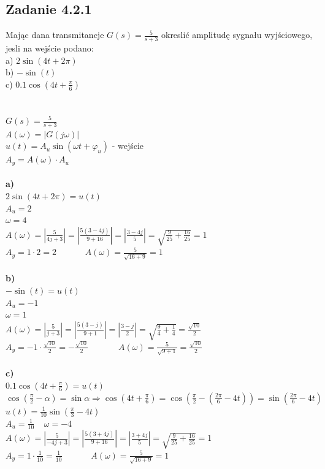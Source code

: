 \subsection*{Zadanie 4.2.1} {\color{darkgray}
	Mając dana transmitancje $G(s)=\frac{5}{s+3}$ okreslić amplitudę sygnału wyjściowego, jesli na wejście podano:\\
	a) $2\sin(4t+2 \pi)$\\
	b) $-\sin(t)$\\
	c) $0.1\cos(4t+\frac\pi 6)$\\
}\lineh
\\\\
$G(s)=\frac{5}{s+3}$\\
$A(\omega)=|G(j\omega)|$\\
$u(t)=A_u\sin(\omega t+\varphi_u )$ - wejście\\
$A_y=A(\omega) \cdot A_u$\\
\\
\textbf{a)}\\
$2\sin(4t+2\pi)=u(t)$\\
$A_u=2$\\
$\omega=4$\\
$A(\omega)=|\frac{5}{4j+3}|=|\frac{5(3-4j)}{9+16}|=|\frac{3-4j}{5}|=\sqrt{\frac{9}{25}+\frac{16}{25}}=1$\\
$A_y=1 \cdot 2 = \boxed{2}$ \ \ \ \ \ \   {\color{lightgray}$A(\omega)=\frac{5}{\sqrt{16+9}}=1$}\\
\\
\textbf{b)}\\
$-\sin(t)=u(t)$\\
$A_u=-1$\\
$\omega=1$\\
$A(\omega)=|\frac{5}{j+3}|=|\frac{5(3-j)}{9+1}|=|\frac{3-j}{2}|=\sqrt{\frac 94+\frac 14}=\frac{\sqrt{10}}{2}$\\
$A_y=-1 \cdot \frac{\sqrt{10}}{2}=\boxed{-\frac{\sqrt{10}}{2}}$\ \ \ \ \ \ \   {\color{lightgray}$A(\omega)=\frac{5}{\sqrt{9+1}}=\frac{\sqrt{10}}{2}$}\\
\\
\textbf{c)}\\
$0.1\cos(4t+\frac\pi 6)=u(t)$\\
$\cos(\frac\pi 2 - \alpha)=\sin \alpha \Rightarrow \cos(4t+\frac \pi 6 ) = \cos (\frac \pi 2 -(\frac{2\pi}{6} - 4t))= \sin(\frac{2\pi}{6}-4t)$\\
$u(t)=\frac{1}{10}\sin(\frac \pi 3 - 4t)$\\
$A_u = \frac{1}{10} \ \ \ \ \ \omega=-4$\\
$A(\omega)=|\frac{5}{-4j+3}|=|\frac{5(3+4j)}{9+16}|=|\frac{3+4j}{5}|=\sqrt{\frac{9}{25}+\frac{16}{25}}=1$\\
$A_y=1 \cdot \frac{1}{10} = \boxed{\frac{1}{10}}$ \ \ \ \ \ \   {\color{lightgray}$A(\omega)=\frac{5}{\sqrt{16+9}}=1$}\\

